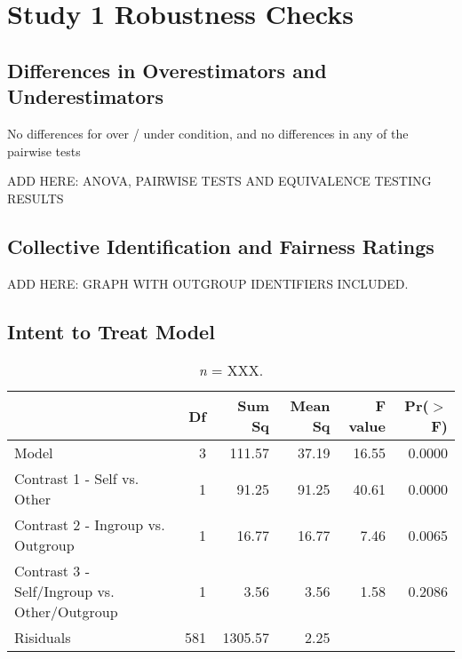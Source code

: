 \documentclass[12pt,]{article}
\begin{document}

\clearpage
\section{Study 1 Robustness Checks}
\label{appendix:study1_robust}


\subsection{Differences in Overestimators and Underestimators}
\label{appendix:over_under1}

No differences for over / under condition, and no differences in any of the pairwise tests 

ADD HERE: ANOVA, PAIRWISE TESTS AND EQUIVALENCE TESTING RESULTS 




\clearpage
\subsection{Collective Identification and Fairness Ratings}
\label{appendix:CID1}

ADD HERE: GRAPH WITH OUTGROUP IDENTIFIERS INCLUDED.  




\clearpage
\subsection{Intent to Treat Model}
\label{appendix:itt1}

\begin{table}[ht]
\centering
\begin{tabular}{lrrrrr}
  \hline
 & Df & Sum Sq & Mean Sq & F value & Pr($>$F) \\ 
  \hline
Model & 3 & 111.57 & 37.19 & 16.55 & 0.0000 \\ 
  Contrast 1 - Self vs. Other & 1 & 91.25 & 91.25 & 40.61 & 0.0000 \\ 
  Contrast 2 - Ingroup vs. Outgroup & 1 & 16.77 & 16.77 & 7.46 & 0.0065 \\ 
  Contrast 3 - Self/Ingroup vs. Other/Outgroup & 1 & 3.56 & 3.56 & 1.58 & 0.2086 \\ 
  Risiduals & 581 & 1305.57 & 2.25 &  &  \\ 
   \hline
\end{tabular}
\caption{{\color{red}{INCOMPLETE: Intent-to-treat model}} \emph{n} = XXX. } 
\label{ITT1}
\end{table}
\end{document}
